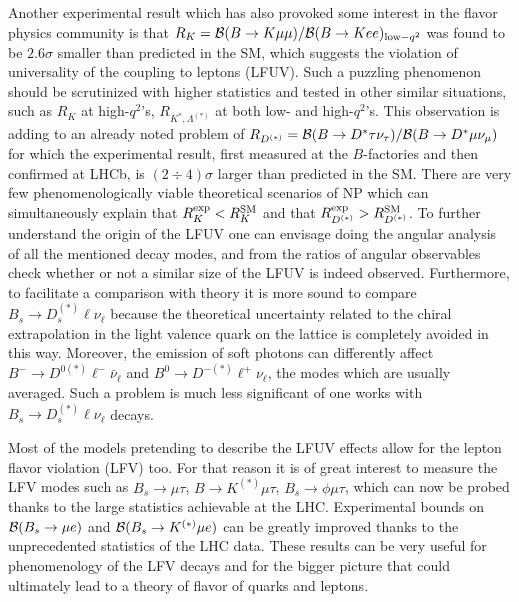 Another experimental result which has also provoked some interest in the flavor physics community is that $R_K = {\cal B}(B\rightarrow K\mu\mu)/{\cal B}(B\rightarrow Kee)_{{\rm low}-q^2}$ was found to be $2.6\sigma$ smaller than  predicted in the SM, which suggests the violation of universality of the coupling to leptons (LFUV). Such a puzzling phenomenon should be scrutinized with higher statistics and tested in other similar situations, 
such as $R_K$ at high-$q^2$'s, $R_{K^\ast , \Lambda^{(\ast )}}$ at both low- and high-$q^2$'s. This observation is adding to an already noted problem of $R_{D^{(\ast)}}=  {\cal B}(B\rightarrow D^{\ast}\tau\nu_\tau)/{\cal B}(B\rightarrow D^{\ast}\mu\nu_\mu)$ for which the experimental result, first measured at the $B$-factories and then confirmed at LHCb, is $(2\div 4)\sigma$ larger than predicted in the SM. There are very few phenomenologically viable theoretical scenarios of NP which can simultaneously explain that $R_K^{\rm exp}<R_K^{\rm SM}$ and that $R_{D^{(\ast )}}^{\rm exp} > R_{D^{(\ast )}}^{\rm SM}$. To further understand the origin of the LFUV one can envisage doing the angular analysis of all the mentioned decay modes, and from the ratios of angular observables check whether or not a similar size of the LFUV is indeed observed. 
Furthermore, to facilitate a comparison with theory it is more sound to compare $B_s\to D_s^{(\ast)}\ell \nu_\ell$ because the theoretical uncertainty related to the chiral extrapolation in the light valence quark on the lattice is completely avoided in this way. Moreover, the emission of soft photons can differently affect $B^- \to D^{0 (\ast)}\ell^- \bar \nu_\ell$ and $B^0 \to D^{- (\ast)}\ell^+ \nu_\ell$, the modes which are usually averaged. Such a problem is much less significant of one works with $B_s\to D_s^{(\ast)}\ell \nu_\ell$ decays. 

Most of the models pretending to describe the LFUV effects allow for the lepton flavor violation (LFV) too. For that reason it is of great interest to measure the LFV modes such as $B_s\to \mu \tau$, $B\to K^{(\ast )}\mu \tau$,  $B_s\to \phi \mu \tau$, which can now be probed thanks to the large statistics achievable at the LHC. Experimental bounds on ${\cal B}(B_s\rightarrow \mu e)$ and ${\cal B}(B_s\rightarrow K^{(\ast )} \mu e)$ can be greatly improved thanks to the unprecedented statistics of the LHC data. These results can be very useful for phenomenology of the LFV decays and for the bigger picture that could ultimately lead to a theory of flavor of quarks and leptons. 


